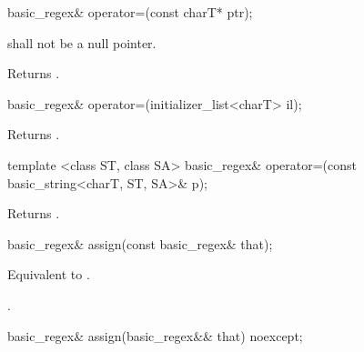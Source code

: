 %
%
\begin{itemdecl}
basic_regex& operator=(const charT* ptr); 
\end{itemdecl}

\begin{itemdescr}
\pnum
\requires  {} shall not be a null pointer. 

\pnum
\effects Returns .
\end{itemdescr}

%
%
\begin{itemdecl}
basic_regex& operator=(initializer_list<charT> il);
\end{itemdecl}

\begin{itemdescr}
\pnum
\effects Returns .
\end{itemdescr}

%
%
\begin{itemdecl}
template <class ST, class SA>
  basic_regex& operator=(const basic_string<charT, ST, SA>& p); 
\end{itemdecl}

\begin{itemdescr}
\pnum
\effects Returns .
\end{itemdescr}

%
%
\begin{itemdecl}
basic_regex& assign(const basic_regex& that); 
\end{itemdecl}

\begin{itemdescr}
\pnum
\effects  Equivalent to .

\pnum
\returns  {}.
\end{itemdescr}

%
%
\begin{itemdecl}
basic_regex& assign(basic_regex&& that) noexcept;
\end{itemdecl}

